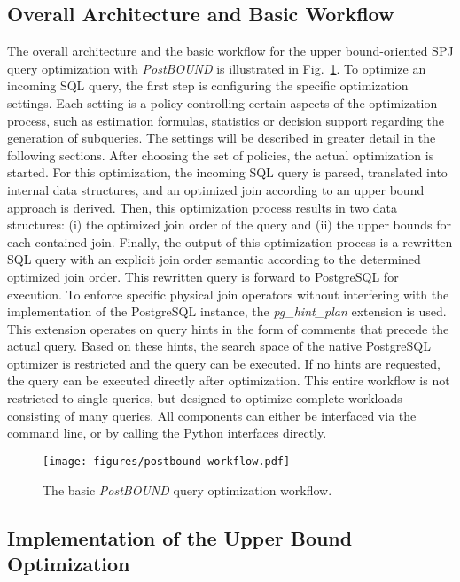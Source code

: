 \subsection{Overall Architecture and Basic Workflow}
\label{sec:postbound-workflow}

The overall architecture and the basic workflow for the upper bound-oriented SPJ query optimization with \emph{PostBOUND} is illustrated in Fig.~\ref{fig:postbound-workflow}. 
To optimize an incoming SQL query, the first step is configuring the specific optimization settings.
Each setting is a policy controlling certain aspects of the optimization process, such as estimation formulas, statistics or decision support regarding the generation of subqueries. 
The settings will be described in greater detail in the following sections. 
After choosing the set of policies, the actual optimization is started.
For this optimization, the incoming SQL query is parsed, translated into internal data structures, and an optimized join according to an upper bound approach is derived. 
Then, this optimization process results in two data structures: (i) the optimized join order of the query and (ii) the upper bounds for each contained join.
Finally, the output of this optimization process is a rewritten SQL query with an explicit join order semantic according to the determined optimized join order.
This rewritten query is forward to PostgreSQL for execution. 
To enforce specific physical join operators without interfering with the implementation of the PostgreSQL instance, the \emph{pg\_hint\_plan}  extension is used. 
This extension operates on query hints in the form of comments that precede the actual query.
Based on these hints, the search space of the native PostgreSQL optimizer is restricted and the query can be executed. 
If no hints are requested, the query can be executed directly after optimization. 
This entire workflow is not restricted to single queries, but designed to optimize complete workloads consisting of many queries. 
All components can either be interfaced via the command line, or by calling the Python interfaces directly.

\begin{figure}[tb]
	\centering
	\texttt{[image: figures/postbound-workflow.pdf]}
	\caption{The basic \emph{PostBOUND} query optimization workflow.}
	\label{fig:postbound-workflow}
\end{figure}

\subsection{Implementation of the Upper Bound Optimization}
\label{sec:postbound-optimization}

